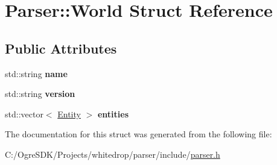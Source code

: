 \hypertarget{struct_parser_1_1_world}{\section{Parser\+:\+:World Struct Reference}
\label{struct_parser_1_1_world}
}
\subsection*{Public Attributes}
\begin{DoxyCompactItemize}
\item 
\hypertarget{struct_parser_1_1_world_a8304a9b1bc7c4b652146c1acec7b4436}{std\+::string {\bfseries name}}\label{struct_parser_1_1_world_a8304a9b1bc7c4b652146c1acec7b4436}

\item 
\hypertarget{struct_parser_1_1_world_a9a69c5c93ef0541a25fcd05cfaf71d7f}{std\+::string {\bfseries version}}\label{struct_parser_1_1_world_a9a69c5c93ef0541a25fcd05cfaf71d7f}

\item 
\hypertarget{struct_parser_1_1_world_a9351c397bfae42405f652dcf785a82b2}{std\+::vector$<$ \hyperlink{struct_parser_1_1_entity}{Entity} $>$ {\bfseries entities}}\label{struct_parser_1_1_world_a9351c397bfae42405f652dcf785a82b2}

\end{DoxyCompactItemize}


The documentation for this struct was generated from the following file\+:\begin{DoxyCompactItemize}
\item 
C\+:/\+Ogre\+S\+D\+K/\+Projects/whitedrop/parser/include/\hyperlink{parser_8h}{parser.\+h}\end{DoxyCompactItemize}
